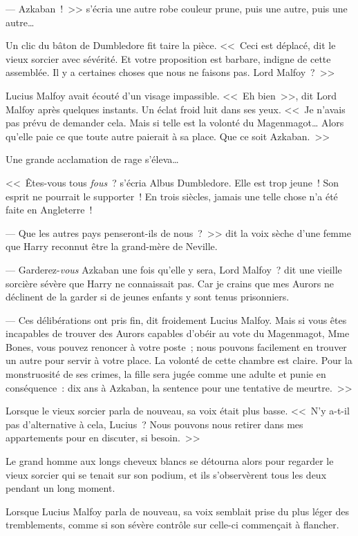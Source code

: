 --- Azkaban~!~>> s'écria une autre robe couleur prune, puis une autre, puis une autre…

Un clic du bâton de Dumbledore fit taire la pièce. <<~Ceci est déplacé, dit le vieux sorcier avec sévérité. Et votre proposition est barbare, indigne de cette assemblée. Il y a certaines choses que nous ne faisons pas. Lord Malfoy~?~>>

Lucius Malfoy avait écouté d'un visage impassible. <<~Eh bien~>>, dit Lord Malfoy après quelques instants. Un éclat froid luit dans ses yeux. <<~Je n'avais pas prévu de demander cela. Mais si telle est la volonté du Magenmagot… Alors qu'elle paie ce que toute autre paierait à sa place. Que ce soit Azkaban.~>>

Une grande acclamation de rage s'éleva…

<<~Êtes-vous tous \emph{fous}~? s'écria Albus Dumbledore. Elle est trop jeune~! Son esprit ne pourrait le supporter~! En trois siècles, jamais une telle chose n'a été faite en Angleterre~!

--- Que les autres pays penseront-ils de nous~?~>> dit la voix sèche d'une femme que Harry reconnut être la grand-mère de Neville.

--- Garderez-\emph{vous} Azkaban une fois qu'elle y sera, Lord Malfoy~? dit une vieille sorcière sévère que Harry ne connaissait pas. Car je crains que mes Aurors ne déclinent de la garder si de jeunes enfants y sont tenus prisonniers.

--- Ces délibérations ont pris fin, dit froidement Lucius Malfoy. Mais si vous êtes incapables de trouver des Aurors capables d'obéir au vote du Magenmagot, Mme Bones, vous pouvez renoncer à votre poste~; nous pouvons facilement en trouver un autre pour servir à votre place. La volonté de cette chambre est claire. Pour la monstruosité de ses crimes, la fille sera jugée comme une adulte et punie en conséquence~: dix ans à Azkaban, la sentence pour une tentative de meurtre.~>>

Lorsque le vieux sorcier parla de nouveau, sa voix était plus basse. <<~N'y a-t-il pas d'alternative à cela, Lucius~? Nous pouvons nous retirer dans mes appartements pour en discuter, si besoin.~>>

Le grand homme aux longs cheveux blancs se détourna alors pour regarder le vieux sorcier qui se tenait sur son podium, et ils s'observèrent tous les deux pendant un long moment.

Lorsque Lucius Malfoy parla de nouveau, sa voix semblait prise du plus léger des tremblements, comme si son sévère contrôle sur celle-ci commençait à flancher.

